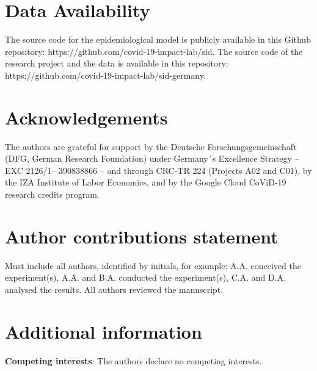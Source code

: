 \documentclass[fleqn,10pt]{wlscirep}
\begin{document}
\section*{Data Availability}

The source code for the epidemiological model is publicly available in this Github
repository: https://github.com/covid-19-impact-lab/sid. The source code of the research
project and the data is available in this repository:
https://github.com/covid-19-impact-lab/sid-germany.



\section*{Acknowledgements}

The authors are grateful for support by the Deutsche Forschungsgemeinschaft (DFG, German
Research Foundation) under Germany´s Excellence Strategy – EXC 2126/1– 390838866 – and
through CRC-TR 224 (Projects A02 and C01), by the IZA Institute of Labor Economics, and
by the Google Cloud CoViD-19 research credits program.

\section*{Author contributions statement}

Must include all authors, identified by initials, for example: A.A. conceived the
experiment(s),  A.A. and B.A. conducted the experiment(s), C.A. and D.A. analysed the
results.  All authors reviewed the manuscript.

\section*{Additional information}

\textbf{Competing interests}: The authors declare no competing interests.
\end{document}

